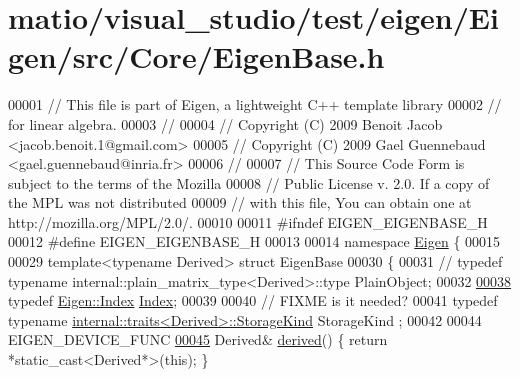 \hypertarget{matio_2visual__studio_2test_2eigen_2_eigen_2src_2_core_2_eigen_base_8h_source}{}\section{matio/visual\+\_\+studio/test/eigen/\+Eigen/src/\+Core/\+Eigen\+Base.h}
\label{matio_2visual__studio_2test_2eigen_2_eigen_2src_2_core_2_eigen_base_8h_source}

\begin{DoxyCode}
00001 \textcolor{comment}{// This file is part of Eigen, a lightweight C++ template library}
00002 \textcolor{comment}{// for linear algebra.}
00003 \textcolor{comment}{//}
00004 \textcolor{comment}{// Copyright (C) 2009 Benoit Jacob <jacob.benoit.1@gmail.com>}
00005 \textcolor{comment}{// Copyright (C) 2009 Gael Guennebaud <gael.guennebaud@inria.fr>}
00006 \textcolor{comment}{//}
00007 \textcolor{comment}{// This Source Code Form is subject to the terms of the Mozilla}
00008 \textcolor{comment}{// Public License v. 2.0. If a copy of the MPL was not distributed}
00009 \textcolor{comment}{// with this file, You can obtain one at http://mozilla.org/MPL/2.0/.}
00010 
00011 \textcolor{preprocessor}{#ifndef EIGEN\_EIGENBASE\_H}
00012 \textcolor{preprocessor}{#define EIGEN\_EIGENBASE\_H}
00013 
00014 \textcolor{keyword}{namespace }\hyperlink{namespace_eigen}{Eigen} \{
00015 
00029 \textcolor{keyword}{template}<\textcolor{keyword}{typename} Derived> \textcolor{keyword}{struct }EigenBase
00030 \{
00031 \textcolor{comment}{//   typedef typename internal::plain\_matrix\_type<Derived>::type PlainObject;}
00032   
\hyperlink{group___core___module_a554f30542cc2316add4b1ea0a492ff02}{00038}   \textcolor{keyword}{typedef} \hyperlink{namespace_eigen_a62e77e0933482dafde8fe197d9a2cfde}{Eigen::Index} \hyperlink{group___core___module_a554f30542cc2316add4b1ea0a492ff02}{Index};
00039 
00040   \textcolor{comment}{// FIXME is it needed?}
00041   \textcolor{keyword}{typedef} \textcolor{keyword}{typename} \hyperlink{struct_eigen_1_1internal_1_1traits}{internal::traits<Derived>::StorageKind} StorageKind
      ;
00042 
00044   EIGEN\_DEVICE\_FUNC
\hyperlink{group___core___module_a324b16961a11d2ecfd2d1b7dd7946545}{00045}   Derived& \hyperlink{group___core___module_a324b16961a11d2ecfd2d1b7dd7946545}{derived}() \{ \textcolor{keywordflow}{return} *\textcolor{keyword}{static\_cast<}Derived*\textcolor{keyword}{>}(\textcolor{keyword}{this}); \}

\end{DoxyCode}
